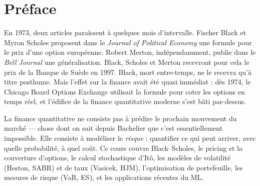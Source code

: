 \documentclass[12pt,a4paper,twoside]{book}
\theoremstyle{definition}
\theoremstyle{plain}
\theoremstyle{remark}
\begin{document}
\begin{titlepage}
\end{titlepage}

\frontmatter
\tableofcontents


\chapter*{Pr\'eface}

En 1973, deux articles para\^issent \`a quelques mois d'intervalle. Fischer Black et Myron Scholes proposent dans le \emph{Journal of Political Economy} une formule pour le prix d'une option europ\'eenne. Robert Merton, ind\'ependamment, publie dans le \emph{Bell Journal} une g\'en\'eralisation. Black, Scholes et Merton recevront pour cela le prix de la Banque de Su\`ede en 1997. Black, mort entre-temps, ne le recevra qu'\`a titre posthume. Mais l'effet sur la finance avait \'et\'e quasi imm\'ediat : d\`es 1974, le Chicago Board Options Exchange utilisait la formule pour coter les options en temps r\'eel, et l'\'edifice de la finance quantitative moderne s'est b\^ati par-dessus.

\medskip

La finance quantitative ne consiste pas \`a pr\'edire le prochain mouvement du march\'e --- chose dont on sait depuis Bachelier que c'est essentiellement impossible. Elle consiste \`a mod\'eliser le \emph{risque} : quantifier ce qui peut arriver, avec quelle probabilit\'e, \`a quel co\^ut. Ce cours couvre Black--Scholes, le pricing et la couverture d'options, le calcul stochastique d'It\^o, les mod\`eles de volatilit\'e (Heston, SABR) et de taux (Vasicek, HJM), l'optimisation de portefeuille, les mesures de risque (VaR, ES), et les applications r\'ecentes du ML.
\end{document}
